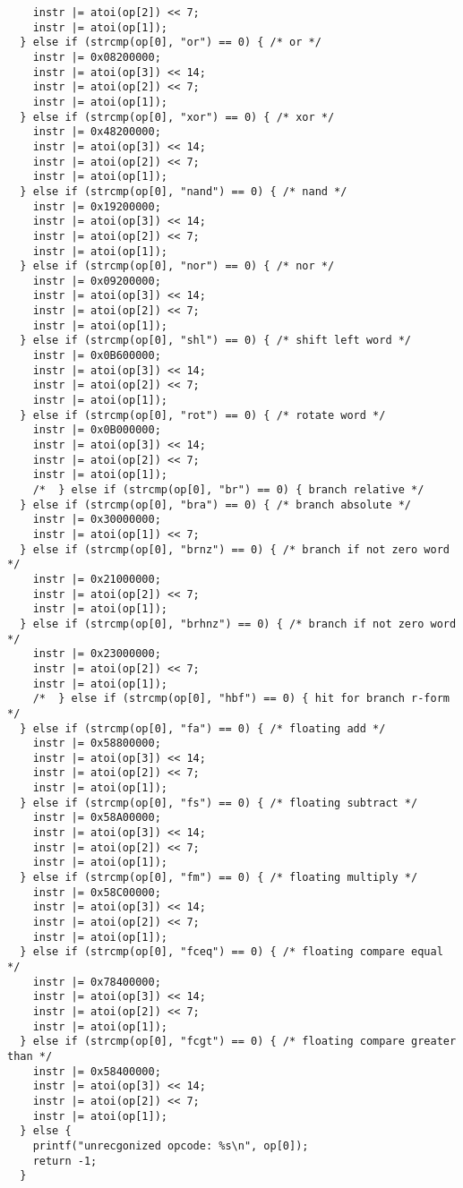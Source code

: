 \documentclass[preprint,authoryear,12pt]{elsarticle}
\begin{document}
\begin{verbatim}
    instr |= atoi(op[2]) << 7;
    instr |= atoi(op[1]);
  } else if (strcmp(op[0], "or") == 0) { /* or */
    instr |= 0x08200000;
    instr |= atoi(op[3]) << 14;
    instr |= atoi(op[2]) << 7;
    instr |= atoi(op[1]);
  } else if (strcmp(op[0], "xor") == 0) { /* xor */
    instr |= 0x48200000;
    instr |= atoi(op[3]) << 14;
    instr |= atoi(op[2]) << 7;
    instr |= atoi(op[1]);
  } else if (strcmp(op[0], "nand") == 0) { /* nand */
    instr |= 0x19200000;
    instr |= atoi(op[3]) << 14;
    instr |= atoi(op[2]) << 7;
    instr |= atoi(op[1]);
  } else if (strcmp(op[0], "nor") == 0) { /* nor */
    instr |= 0x09200000;
    instr |= atoi(op[3]) << 14;
    instr |= atoi(op[2]) << 7;
    instr |= atoi(op[1]);
  } else if (strcmp(op[0], "shl") == 0) { /* shift left word */
    instr |= 0x0B600000;
    instr |= atoi(op[3]) << 14;
    instr |= atoi(op[2]) << 7;
    instr |= atoi(op[1]);
  } else if (strcmp(op[0], "rot") == 0) { /* rotate word */
    instr |= 0x0B000000;
    instr |= atoi(op[3]) << 14;
    instr |= atoi(op[2]) << 7;
    instr |= atoi(op[1]);
    /*  } else if (strcmp(op[0], "br") == 0) { branch relative */
  } else if (strcmp(op[0], "bra") == 0) { /* branch absolute */
    instr |= 0x30000000;
    instr |= atoi(op[1]) << 7;
  } else if (strcmp(op[0], "brnz") == 0) { /* branch if not zero word */
    instr |= 0x21000000;
    instr |= atoi(op[2]) << 7;
    instr |= atoi(op[1]);
  } else if (strcmp(op[0], "brhnz") == 0) { /* branch if not zero word */
    instr |= 0x23000000;
    instr |= atoi(op[2]) << 7;
    instr |= atoi(op[1]);
    /*  } else if (strcmp(op[0], "hbf") == 0) { hit for branch r-form */
  } else if (strcmp(op[0], "fa") == 0) { /* floating add */
    instr |= 0x58800000;
    instr |= atoi(op[3]) << 14;
    instr |= atoi(op[2]) << 7;
    instr |= atoi(op[1]);
  } else if (strcmp(op[0], "fs") == 0) { /* floating subtract */
    instr |= 0x58A00000;
    instr |= atoi(op[3]) << 14;
    instr |= atoi(op[2]) << 7;
    instr |= atoi(op[1]);
  } else if (strcmp(op[0], "fm") == 0) { /* floating multiply */
    instr |= 0x58C00000;
    instr |= atoi(op[3]) << 14;
    instr |= atoi(op[2]) << 7;
    instr |= atoi(op[1]);
  } else if (strcmp(op[0], "fceq") == 0) { /* floating compare equal */
    instr |= 0x78400000;
    instr |= atoi(op[3]) << 14;
    instr |= atoi(op[2]) << 7;
    instr |= atoi(op[1]);
  } else if (strcmp(op[0], "fcgt") == 0) { /* floating compare greater than */
    instr |= 0x58400000;
    instr |= atoi(op[3]) << 14;
    instr |= atoi(op[2]) << 7;
    instr |= atoi(op[1]);
  } else {
    printf("unrecgonized opcode: %s\n", op[0]);
    return -1;
  }


\end{verbatim}
\end{document}
